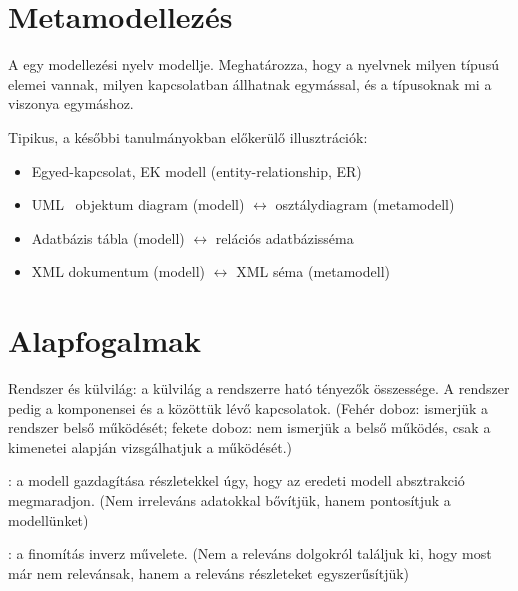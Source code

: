 \section{Metamodellezés}

\begin{definicio}
	A  egy modellezési nyelv modellje. Meghatározza, hogy a nyelvnek milyen típusú elemei vannak, milyen kapcsolatban állhatnak egymással, és a típusoknak mi a viszonya egymáshoz.
\end{definicio}

Tipikus, a későbbi tanulmányokban előkerülő illusztrációk:

\begin{itemize}
	\item Egyed-kapcsolat, EK modell (entity-relationship, ER)
	\item UML~\cite{UML} objektum diagram (modell) $\leftrightarrow$ osztálydiagram (metamodell)
	\item Adatbázis tábla (modell) $\leftrightarrow$ relációs adatbázisséma
	\item XML dokumentum (modell) $\leftrightarrow$ XML séma (metamodell)
\end{itemize}

\section{Alapfogalmak}

\begin{definicio}
	Rendszer és külvilág: a külvilág a rendszerre ható tényezők összessége. A rendszer pedig a komponensei és a közöttük lévő kapcsolatok. (Fehér doboz: ismerjük a rendszer belső működését; fekete doboz: nem ismerjük a belső működés, csak a kimenetei alapján vizsgálhatjuk a működését.)
\end{definicio}


\begin{definicio}
	: a modell gazdagítása részletekkel úgy, hogy az eredeti modell absztrakció megmaradjon. (Nem irreleváns adatokkal bővítjük, hanem pontosítjuk a modellünket)
\end{definicio}

\begin{definicio}
	: a finomítás inverz művelete. (Nem a releváns dolgokról találjuk ki, hogy most már nem relevánsak, hanem a releváns részleteket egyszerűsítjük)
\end{definicio}

